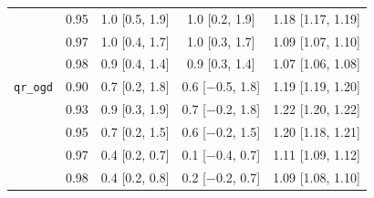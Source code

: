 \begin{tabular}{@{}llccc@{}}
 & 0.95 & 1.0 [0.5, 1.9] & 1.0 [0.2, 1.9] & 1.18 [1.17, 1.19] \\
 & 0.97 & 1.0 [0.4, 1.7] & 1.0 [0.3, 1.7] & 1.09 [1.07, 1.10] \\
 & 0.98 & 0.9 [0.4, 1.4] & 0.9 [0.3, 1.4] & 1.07 [1.06, 1.08] \\
\addlinespace
\texttt{qr\_ogd} & 0.90 & 0.7 [0.2, 1.8] & 0.6 [$-$0.5, 1.8] & 1.19 [1.19, 1.20] \\
 & 0.93 & 0.9 [0.3, 1.9] & 0.7 [$-$0.2, 1.8] & 1.22 [1.20, 1.22] \\
 & 0.95 & 0.7 [0.2, 1.5] & 0.6 [$-$0.2, 1.5] & 1.20 [1.18, 1.21] \\
 & 0.97 & 0.4 [0.2, 0.7] & 0.1 [$-$0.4, 0.7] & 1.11 [1.09, 1.12] \\
 & 0.98 & 0.4 [0.2, 0.8] & 0.2 [$-$0.2, 0.7] & 1.09 [1.08, 1.10] \\
\bottomrule
\end{tabular}
